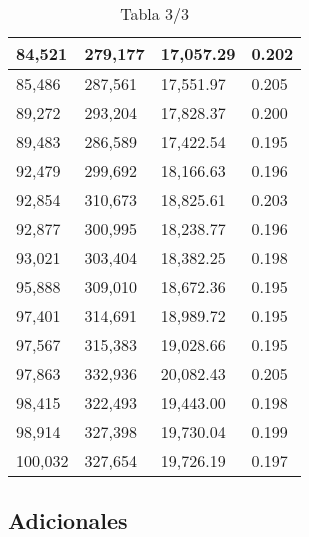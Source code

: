 \begin{table}[H]
{\begin{tabular}{| l | l | l |l |}
84,521	&	279,177	&	17,057.29	&	0.202	\\ \hline
85,486	&	287,561	&	17,551.97	&	0.205	\\ \hline
89,272	&	293,204	&	17,828.37	&	0.200	\\ \hline
89,483	&	286,589	&	17,422.54	&	0.195	\\ \hline
92,479	&	299,692	&	18,166.63	&	0.196	\\ \hline
92,854	&	310,673	&	18,825.61	&	0.203	\\ \hline
92,877	&	300,995	&	18,238.77	&	0.196	\\ \hline
93,021	&	303,404	&	18,382.25	&	0.198	\\ \hline
95,888	&	309,010	&	18,672.36	&	0.195	\\ \hline
97,401	&	314,691	&	18,989.72	&	0.195	\\ \hline
97,567	&	315,383	&	19,028.66	&	0.195	\\ \hline
97,863	&	332,936	&	20,082.43	&	0.205	\\ \hline
98,415	&	322,493	&	19,443.00	&	0.198	\\ \hline
98,914	&	327,398	&	19,730.04	&	0.199	\\ \hline
100,032	&	327,654	&	19,726.19	&	0.197	\\ \hline



  \end{tabular}
   \caption*{Tabla 3/3}
}
\end{table}

\newpage
\subsection{Adicionales}
